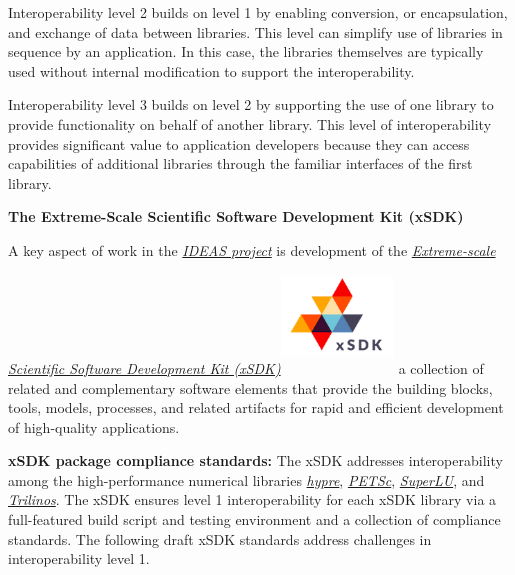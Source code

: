 \documentclass[]{article}
\begin{document}
Interoperability level 2 builds on level 1 by enabling conversion, or
encapsulation, and exchange of data between libraries. This level can
simplify use of libraries in sequence by an application. In this case,
the libraries themselves are typically used without internal
modification to support the interoperability.

Interoperability level 3 builds on level 2 by supporting the use of one
library to provide functionality on behalf of another library. This
level of interoperability provides significant value to application
developers because they can access capabilities of additional libraries
through the familiar interfaces of the first library.


\textbf{The Extreme-Scale Scientific Software Development Kit (xSDK)}

A key aspect of work in the
\href{https://ideas-productivity.org/}{\emph{IDEAS project}} is
development of the \href{http://xsdk.info}{\emph{Extreme-scale
Scientific Software Development Kit (xSDK)}}\includegraphics[width=3cm,height=3cm]{xsdk} a collection of related 
and complementary software elements that provide the building blocks,
tools, models, processes, and related artifacts for rapid and efficient
development of high-quality applications.

\textbf{xSDK package compliance standards:} The xSDK addresses
interoperability among the high-performance numerical libraries
\href{https://computation.llnl.gov/project/linear_solvers/}{\emph{hypre}},
\href{https://www.mcs.anl.gov/petsc/}{\emph{PETSc}},
\href{http://crd.lbl.gov/~xiaoye/SuperLU/}{\emph{SuperLU}}, and
\href{https://trilinos.org/}{\emph{Trilinos}}. The xSDK ensures level 1
interoperability for each xSDK library via a full-featured build script
and testing environment and a collection of compliance standards. The
following draft xSDK standards address challenges in interoperability
level 1.
\end{document}
